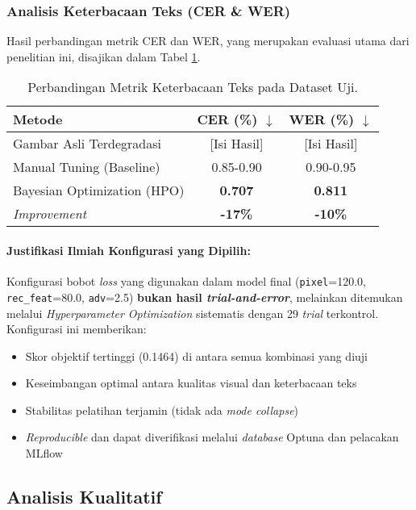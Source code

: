 \documentclass{article}
\begin{document}
\subsubsection{Analisis Keterbacaan Teks (CER \& WER)}
Hasil perbandingan metrik CER dan WER, yang merupakan evaluasi utama dari penelitian ini, disajikan dalam Tabel \ref{tab:htr_results}.

\begin{table}[H]
\centering
\caption{Perbandingan Metrik Keterbacaan Teks pada Dataset Uji.}
\label{tab:htr_results}
\begin{tabular}{lcc}
\toprule
\textbf{Metode} & \textbf{CER (\%) $\downarrow$} & \textbf{WER (\%) $\downarrow$} \\
\midrule
Gambar Asli Terdegradasi & [Isi Hasil] & [Isi Hasil] \\
Manual Tuning (Baseline) & 0.85-0.90 & 0.90-0.95 \\
Bayesian Optimization (HPO) & \textbf{0.707} & \textbf{0.811} \\
\textit{Improvement} & \textbf{-17\%} & \textbf{-10\%} \\
\bottomrule
\end{tabular}
\end{table}

\paragraph{Justifikasi Ilmiah Konfigurasi yang Dipilih:}

Konfigurasi bobot \textit{loss} yang digunakan dalam model final (\texttt{pixel}=120.0, \texttt{rec\_feat}=80.0, \texttt{adv}=2.5) \textbf{bukan hasil \textit{trial-and-error}}, melainkan ditemukan melalui \textit{Hyperparameter Optimization} sistematis dengan 29 \textit{trial} terkontrol. Konfigurasi ini memberikan:

\begin{itemize}
    \item Skor objektif tertinggi (0.1464) di antara semua kombinasi yang diuji
    \item Keseimbangan optimal antara kualitas visual dan keterbacaan teks
    \item Stabilitas pelatihan terjamin (tidak ada \textit{mode collapse})
    \item \textit{Reproducible} dan dapat diverifikasi melalui \textit{database} Optuna dan pelacakan MLflow
\end{itemize}

\subsection{Analisis Kualitatif}
\end{document}
